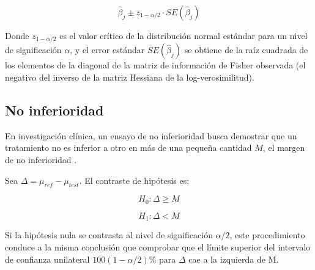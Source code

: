 \begin{equation}
	\hat{\beta}_j \pm z_{1-\alpha/2} \cdot SE(\hat{\beta}_j)
	\label{eq:tobit_ic}
\end{equation}

Donde $z_{1-\alpha/2}$ es el valor crítico de la distribución normal estándar para un nivel de significación $\alpha$, y el error estándar $SE(\hat{\beta}_j)$ se obtiene de la raíz cuadrada de los elementos de la diagonal de la matriz de información de Fisher observada (el negativo del inverso de la matriz Hessiana de la log-verosimilitud).

\subsection{No inferioridad}

En investigación clínica, un ensayo de no inferioridad busca demostrar que un tratamiento no es inferior a otro en más de una pequeña cantidad $M$, el margen de no inferioridad \cite{nauta2020, Uranga2006}.  

\begin{definition}[No inferioridad]  
	Sea $\Delta = \mu_{ref} - \mu_{test}$. El contraste de hipótesis es:
	
	\[
	H_0 : \Delta \geq M \tag{1.11}
	\]
	
	\[
	H_1 : \Delta < M \tag{1.12}
	\]
\end{definition}

Si la hipótesis nula se contrasta al nivel de significación $\alpha/2$, este procedimiento conduce a la misma conclusión que comprobar que el límite superior del intervalo de confianza unilateral $100(1 - \alpha/2)\%$ para $\Delta$ cae a la izquierda de M.
